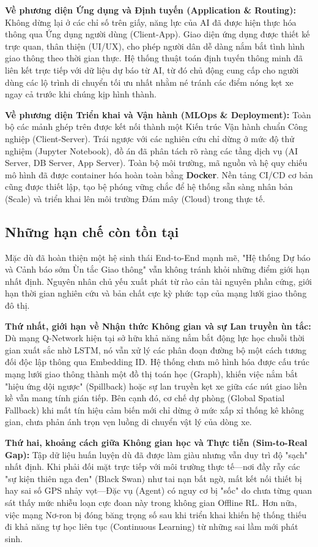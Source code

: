 \textbf{Về phương diện Ứng dụng và Định tuyến (Application \& Routing):} Không dừng lại ở các chỉ số trên giấy, năng lực của AI đã được hiện thực hóa thông qua Ứng dụng người dùng (Client-App). Giao diện ứng dụng được thiết kế trực quan, thân thiện (UI/UX), cho phép người dân dễ dàng nắm bắt tình hình giao thông theo thời gian thực. Hệ thống thuật toán định tuyến thông minh đã liên kết trực tiếp với dữ liệu dự báo từ AI, từ đó chủ động cung cấp cho người dùng các lộ trình di chuyển tối ưu nhất nhằm né tránh các điểm nóng kẹt xe ngay cả trước khi chúng kịp hình thành.

\textbf{Về phương diện Triển khai và Vận hành (MLOps \& Deployment):} Toàn bộ các mảnh ghép trên được kết nối thành một Kiến trúc Vận hành chuẩn Công nghiệp (Client-Server). Trái ngược với các nghiên cứu chỉ dừng ở mức độ thử nghiệm (Jupyter Notebook), đồ án đã phân tách rõ ràng các tầng dịch vụ (AI Server, DB Server, App Server). Toàn bộ môi trường, mã nguồn và hệ quy chiếu mô hình đã được container hóa hoàn toàn bằng \textbf{Docker}. Nền tảng CI/CD cơ bản cũng được thiết lập, tạo bệ phóng vững chắc để hệ thống sẵn sàng nhân bản (Scale) và triển khai lên môi trường Đám mây (Cloud) trong thực tế.

\subsection{Những hạn chế còn tồn tại}

Mặc dù đã hoàn thiện một hệ sinh thái End-to-End mạnh mẽ, "Hệ thống Dự báo và Cảnh báo sớm Ùn tắc Giao thông" vẫn không tránh khỏi những điểm giới hạn nhất định. Nguyên nhân chủ yếu xuất phát từ rào cản tài nguyên phần cứng, giới hạn thời gian nghiên cứu và bản chất cực kỳ phức tạp của mạng lưới giao thông đô thị.

\textbf{Thứ nhất, giới hạn về Nhận thức Không gian và sự Lan truyền ùn tắc:} Dù mạng Q-Network hiện tại sở hữu khả năng nắm bắt động lực học chuỗi thời gian xuất sắc nhờ LSTM, nó vẫn xử lý các phân đoạn đường bộ một cách tương đối độc lập thông qua Embedding ID. Hệ thống chưa mô hình hóa được cấu trúc mạng lưới giao thông thành một đồ thị toán học (Graph), khiến việc nắm bắt "hiệu ứng dội ngược" (Spillback) hoặc sự lan truyền kẹt xe giữa các nút giao liền kề vẫn mang tính gián tiếp. Bên cạnh đó, cơ chế dự phòng (Global Spatial Fallback) khi mất tín hiệu cảm biến mới chỉ dừng ở mức xấp xỉ thống kê không gian, chưa phản ánh trọn vẹn luồng di chuyển vật lý của dòng xe.

\textbf{Thứ hai, khoảng cách giữa Không gian học và Thực tiễn (Sim-to-Real Gap):} Tập dữ liệu huấn luyện dù đã được làm giàu nhưng vẫn duy trì độ "sạch" nhất định. Khi phải đối mặt trực tiếp với môi trường thực tế—nơi đầy rẫy các "sự kiện thiên nga đen" (Black Swan) như tai nạn bất ngờ, mất kết nối thiết bị hay sai số GPS nhảy vọt—Đặc vụ (Agent) có nguy cơ bị "sốc" do chưa từng quan sát thấy mức nhiễu loạn cực đoan này trong không gian Offline RL. Hơn nữa, việc mạng Nơ-ron bị đóng băng trọng số sau khi triển khai khiến hệ thống thiếu đi khả năng tự học liên tục (Continuous Learning) từ những sai lầm mới phát sinh.

